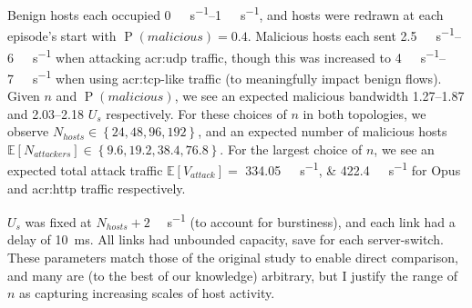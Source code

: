 Benign hosts each occupied \qtyrange{0}{1}{\mega\bit\per\second}, and hosts were redrawn at each episode's start with $\operatorname{P}(\mathit{malicious})=0.4$.
Malicious hosts each sent \qtyrange{2.5}{6}{\mega\bit\per\second} when attacking \gls{acr:udp} traffic, though this was increased to \qtyrange{4}{7}{\mega\bit\per\second} when using \gls{acr:tcp}-like traffic (to meaningfully impact benign flows).
Given $n$ and $\operatorname{P}(\mathit{malicious})$, we see an expected malicious bandwidth \numrange{1.27}{1.87} and \qtyrange{2.03}{2.18}{\times} $U_s$ respectively.
For these choices of $n$ in both topologies, we observe $N_{\mathit{hosts}} \in \left\{24, 48, 96, 192\right\}$, and an expected number of malicious hosts $\mathbb{E}\left[N_{\mathit{attackers}}\right] \in \left\{9.6, 19.2, 38.4, 76.8\right\}$.
For the largest choice of $n$, we see an expected total attack traffic $\mathbb{E}\left[V_{\mathit{attack}}\right] =$ \qtylist{334.05;422.4}{\mega\bit\per\second} for Opus and \gls{acr:http} traffic respectively.

$U_s$ was fixed at $N_{\mathit{hosts}}+2$ \unit{\mega\bit\per\second} (to account for burstiness), and each link had a delay of \qty{10}{\milli\second}.
All links had unbounded capacity, save for each server-switch.
These parameters match those of the original study to enable direct comparison, and many are (to the best of our knowledge) arbitrary, but I justify the range of $n$ as capturing increasing scales of host activity.